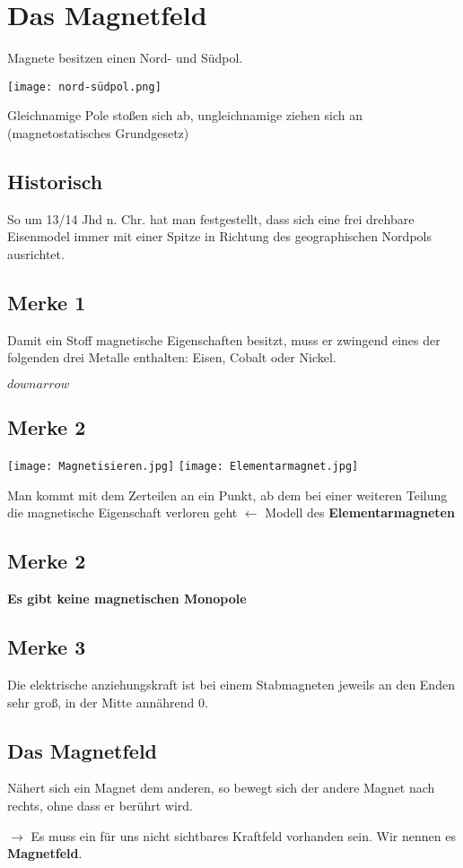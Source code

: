 \documentclass{article}
\begin{document}
\section*{Das Magnetfeld}

Magnete besitzen einen Nord- und Südpol.

\texttt{[image: nord-südpol.png]}

\noindent Gleichnamige Pole stoßen sich ab, ungleichnamige ziehen sich an (magnetostatisches Grundgesetz)

\subsection*{Historisch}

So um 13/14 Jhd n. Chr. hat man festgestellt, dass sich eine frei drehbare Eisenmodel immer mit einer Spitze in Richtung des geographischen Nordpols ausrichtet.

\subsection*{Merke 1}

Damit ein Stoff magnetische Eigenschaften besitzt, muss er zwingend eines der folgenden drei Metalle enthalten: Eisen, Cobalt oder Nickel.

$downarrow$

\subsection*{Merke 2}

\texttt{[image: Magnetisieren.jpg]}
\texttt{[image: Elementarmagnet.jpg]}

\noindent Man kommt mit dem Zerteilen an ein Punkt, ab dem bei einer weiteren Teilung die magnetische Eigenschaft verloren geht $\leftarrow$ Modell des \textbf{Elementarmagneten}

\subsection*{Merke 2}

\textbf{Es gibt keine magnetischen Monopole}

\subsection*{Merke 3}

Die elektrische anziehungskraft ist bei einem Stabmagneten jeweils an den Enden sehr groß, in der Mitte annährend 0.

\subsection*{Das Magnetfeld}

Nähert sich ein Magnet dem anderen, so bewegt sich der andere Magnet nach rechts, ohne dass er berührt wird.

$\rightarrow$ Es muss ein für uns nicht sichtbares Kraftfeld vorhanden sein. Wir nennen es \textbf{Magnetfeld}.
\end{document}
